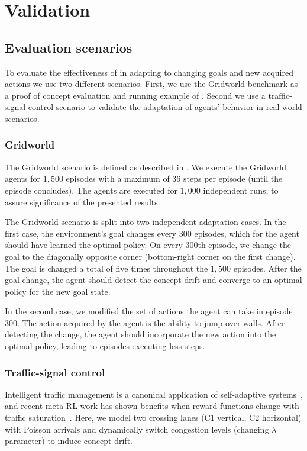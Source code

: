 
\section{Validation}
\label{sec:validation}

\subsection{Evaluation scenarios}
To evaluate the effectiveness of \adaptiverl in adapting to changing goals and new acquired actions 
we use two different scenarios. First, we use the Gridworld benchmark as a proof of concept 
evaluation and running example of \adaptiverl. Second we use a traffic-signal control scenario to 
validate the adaptation of agents' behavior in real-world scenarios.

\subsubsection{Gridworld}
The Gridworld scenario is defined as described in . We execute the Gridworld 
agents for $1,500$ episodes with a maximum of 36 steps per episode (until the episode concludes). 
The agents are executed for $1,000$ independent runs, to assure significance of the presented 
results.

The Gridworld scenario is split into two independent adaptation cases. In the first case, the 
environment's goal changes every 300 episodes, which for the agent should have learned the optimal 
policy. On every 300th episode, we change the goal to the diagonally opposite corner (\eg bottom-right 
corner on the first change). The goal is changed a total of five times throughout the $1,500$ episodes. 
After the goal change, the agent should detect the concept drift and converge to an optimal policy for 
the new goal state.

In the second case, we modified the set of actions the agent can take in episode 300. The action 
acquired by the agent is the ability to jump over walls. After detecting the change, the agent should 
incorporate the new action into the optimal policy, leading to episodes executing less steps. 

\subsubsection{Traffic-signal control}
Intelligent traffic management is a canonical application of self-adaptive 
systems~\cite{HENRICHS2022106940}, and recent meta-\ac{RL} work has shown benefits when 
reward functions change with traffic saturation~\cite{meta-rl-traffic}. Here, we model two crossing 
lanes (C1 vertical, C2 horizontal) with Poisson arrivals and dynamically switch congestion levels 
(changing $\lambda$ parameter) to induce concept drift. 

